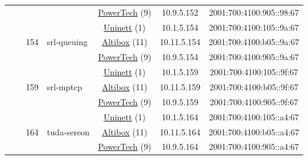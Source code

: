 \begin{small}
\begin{center}
\begin{longtable}{|c|c|c|c|c|c|c|c|}
  &  &  &  & \multicolumn{2}{|c|}{\tiny{\href{http://www.powertech.no}{PowerTech} (9)}} & \tiny{10.9.5.152} & \tiny{2001:700:4100:905::98:67} \\* \cline{3-3}\cline{4-4}\cline{5-5}\cline{6-6}\cline{7-7}\cline{8-8}
  &  & \multirow{3}{*}{\tiny{154}} & \multicolumn{1}{|l|}{\multirow{3}{*}{\tiny{srl-queuing}}} & \multicolumn{2}{|c|}{\tiny{\href{https://www.uninett.no}{Uninett} (1)}} & \tiny{10.1.5.154} & \tiny{2001:700:4100:105::9a:67} \\* \cline{5-5}\cline{6-6}\cline{7-7}\cline{8-8}
  &  &  &  & \multicolumn{2}{|c|}{\tiny{\href{https://www.altibox.no}{Altibox} (11)}} & \tiny{10.11.5.154} & \tiny{2001:700:4100:b05::9a:67} \\* \cline{5-5}\cline{6-6}\cline{7-7}\cline{8-8}
  &  &  &  & \multicolumn{2}{|c|}{\tiny{\href{http://www.powertech.no}{PowerTech} (9)}} & \tiny{10.9.5.154} & \tiny{2001:700:4100:905::9a:67} \\* \cline{3-3}\cline{4-4}\cline{5-5}\cline{6-6}\cline{7-7}\cline{8-8}
  &  & \multirow{3}{*}{\tiny{159}} & \multicolumn{1}{|l|}{\multirow{3}{*}{\tiny{srl-mptcp}}} & \multicolumn{2}{|c|}{\tiny{\href{https://www.uninett.no}{Uninett} (1)}} & \tiny{10.1.5.159} & \tiny{2001:700:4100:105::9f:67} \\* \cline{5-5}\cline{6-6}\cline{7-7}\cline{8-8}
  &  &  &  & \multicolumn{2}{|c|}{\tiny{\href{https://www.altibox.no}{Altibox} (11)}} & \tiny{10.11.5.159} & \tiny{2001:700:4100:b05::9f:67} \\* \cline{5-5}\cline{6-6}\cline{7-7}\cline{8-8}
  &  &  &  & \multicolumn{2}{|c|}{\tiny{\href{http://www.powertech.no}{PowerTech} (9)}} & \tiny{10.9.5.159} & \tiny{2001:700:4100:905::9f:67} \\* \cline{3-3}\cline{4-4}\cline{5-5}\cline{6-6}\cline{7-7}\cline{8-8}
  &  & \multirow{3}{*}{\tiny{164}} & \multicolumn{1}{|l|}{\multirow{3}{*}{\tiny{tuda-sereon}}} & \multicolumn{2}{|c|}{\tiny{\href{https://www.uninett.no}{Uninett} (1)}} & \tiny{10.1.5.164} & \tiny{2001:700:4100:105::a4:67} \\* \cline{5-5}\cline{6-6}\cline{7-7}\cline{8-8}
  &  &  &  & \multicolumn{2}{|c|}{\tiny{\href{https://www.altibox.no}{Altibox} (11)}} & \tiny{10.11.5.164} & \tiny{2001:700:4100:b05::a4:67} \\* \cline{5-5}\cline{6-6}\cline{7-7}\cline{8-8}
  &  &  &  & \multicolumn{2}{|c|}{\tiny{\href{http://www.powertech.no}{PowerTech} (9)}} & \tiny{10.9.5.164} & \tiny{2001:700:4100:905::a4:67} \\* \cline{3-3}\cline{4-4}\cline{5-5}\cline{6-6}\cline{7-7}\cline{8-8}

\end{longtable}
\end{center}
\end{small}
